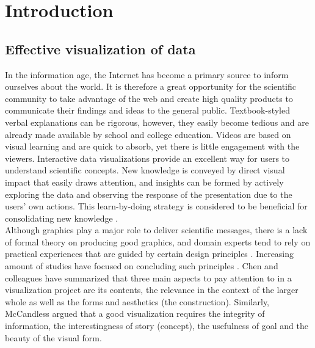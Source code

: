 \documentclass[11pt, a4paper,oneside,chapterprefix=false]{scrbook}
\begin{document}


\tableofcontents

\mainmatter


\chapter{Introduction} \label{chp:introduction}

\section{Effective visualization of data} \label{sec:one}
In the information age, the Internet has become a primary source to inform ourselves about the world. It is therefore a great opportunity for the scientific community to take advantage of the web and create high quality products to communicate their findings and ideas to the general public. Textbook-styled verbal explanations can be rigorous, however, they easily become tedious and are already made available by school and college education. Videos are based on visual learning and are quick to absorb, yet there is little engagement with the viewers. Interactive data visualizations provide an excellent way for users to understand scientific concepts. New knowledge is conveyed by direct visual impact that easily draws attention, and insights can be formed by actively exploring the data and observing the response of the presentation due to the users' own actions. This learn-by-doing strategy is considered to be beneficial for consolidating new knowledge \cite{schank1995we}. \\

Although graphics play a major role to deliver scientific messages, there is a lack of formal theory on producing good graphics, and domain experts tend to rely on practical experiences that are guided by certain design principles \cite{chen2007handbook}. Increasing amount of studies have focused on concluding such principles \cite{senay1990rules,evergreen2013design,midway2020principles}. Chen and colleagues \cite{chen2007handbook} have summarized that three main aspects to pay attention to in a visualization project are its contents, the relevance in the context of the larger whole as well as the forms and aesthetics (the construction). Similarly, McCandless \cite{mccandless2014knowledge} argued that a good visualization requires the integrity of information, the interestingness of story (concept), the usefulness of goal and the beauty of the visual form.\\
\end{document}

